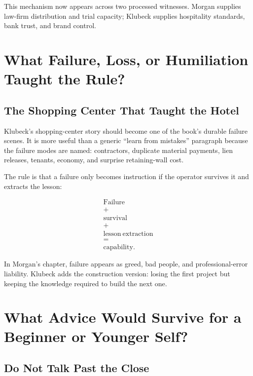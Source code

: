 \documentclass[11pt,oneside]{book}
\begin{document}
This mechanism now appears across two processed witnesses. Morgan supplies law-firm distribution and trial capacity; Klubeck supplies hospitality standards, bank trust, and brand control.

\chapter{What Failure, Loss, or Humiliation Taught the Rule?}

\section{The Shopping Center That Taught the Hotel}

Klubeck's shopping-center story should become one of the book's durable failure scenes. It is more useful than a generic ``learn from mistakes'' paragraph because the failure modes are named: contractors, duplicate material payments, lien releases, tenants, economy, and surprise retaining-wall cost.

The rule is that a failure only becomes instruction if the operator survives it and extracts the lesson:

\begin{equation}
\begin{gathered}
\mathrm{Failure}\\
+\\
\mathrm{survival}\\
+\\
\mathrm{lesson\ extraction}\\
=\\
\mathrm{capability}.
\end{gathered}
\end{equation}

In Morgan's chapter, failure appears as greed, bad people, and professional-error liability. Klubeck adds the construction version: losing the first project but keeping the knowledge required to build the next one.

\chapter{What Advice Would Survive for a Beginner or Younger Self?}

\section{Do Not Talk Past the Close}
\end{document}
